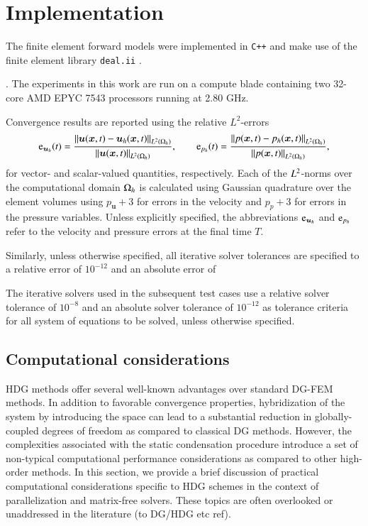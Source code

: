 
\section{Implementation}%
\label{sec:implementation_details}

The finite element forward models were implemented in \texttt{C++} and make use of the finite element library \texttt{deal.ii} \cite{dealII93}.

. 
The experiments in this work are run on a compute blade containing two 32-core AMD EPYC 7543 processors running at 2.80 GHz.

Convergence results are reported using the relative $L^2$-errors 
\begin{equation}
  \text{e}_{\bm{u}_h}(t) = \frac{ \left\lVert \bm{u}(\bm{x}, t) - \bm{u}_h(\bm{x}, t)\right\rVert_{L^2(\Omega_h)} }{ \left\lVert \bm{u}(\bm{x}, t) \right\rVert_{L^2(\Omega_h)} }, \qquad 
  \text{e}_{p_h}(t) =\frac{ \left\lVert p(\bm{x}, t) - p_h(\bm{x}, t)\right\rVert_{L^2(\Omega_h)} }{ \left\lVert p(\bm{x}, t) \right\rVert_{L^2(\Omega_h)} },
\end{equation}
for vector- and scalar-valued quantities, respectively. Each of the $L^2$-norms over the computational domain $\Omega_h$ is calculated using Gaussian quadrature over the element volumes using $p_{\bm{u}} + 3$ for errors in the velocity and $p_{p} + 3$ for errors in the pressure variables.
Unless explicitly specified, the abbreviations $\text{e}_{\bm{u}_h}$ and $\text{e}_{p_h}$ refer to the velocity and pressure errors at the final time $T$.

Similarly, unless otherwise specified, all iterative solver tolerances are specified to a relative error of $10^{-12}$ and an absolute error of 

The iterative solvers used in the subsequent test cases use a relative solver tolerance of $10^{-8}$ and an absolute solver tolerance of $10^{-12}$ as tolerance criteria for all system of equations to be solved, unless otherwise specified.


\subsection{Computational considerations}
\label{sec:computational}

HDG methods offer several well-known advantages over standard DG-FEM methods. 
In addition to favorable convergence properties, hybridization of the system by introducing the space  can lead to a substantial reduction in globally-coupled degrees of freedom as compared to classical DG methods.
However, the complexities associated with the static condensation procedure introduce a set of non-typical computational performance considerations as compared to other high-order methods.
In this section, we provide a brief discussion of practical computational considerations specific to HDG schemes in the context of parallelization and matrix-free solvers. These topics are often overlooked or unaddressed in the literature (to DG/HDG etc ref).

